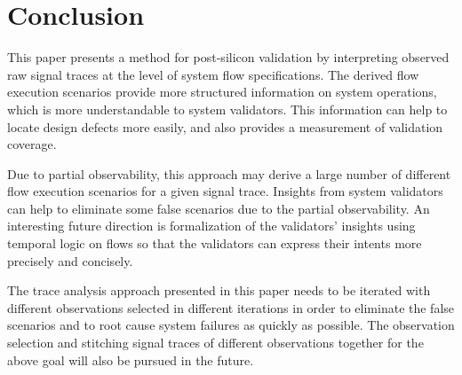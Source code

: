 \documentclass[conference]{IEEEtran}
\begin{document}
%
\section{Conclusion}

This paper presents a method for post-silicon validation by interpreting observed raw signal traces at the level of system flow specifications.  The derived flow execution scenarios provide more structured information on system operations, which is more understandable to system validators.   This information can help to locate design defects more easily, and also provides a measurement of validation coverage.  

Due to partial observability, this approach may derive a large number of different flow execution scenarios for a given signal trace.  Insights from system validators can help to eliminate some false scenarios due to the partial observability.  An interesting future direction is formalization of the validators' insights using temporal logic on flows so that the validators can express their intents more precisely and concisely. 

The trace analysis approach presented in this paper needs to be iterated with different observations selected in different iterations in order to eliminate the false scenarios and to root cause system failures as quickly as possible.  The observation selection and stitching signal traces of different observations together for the above goal will also be pursued in the future.






%
%
%





\end{document}
